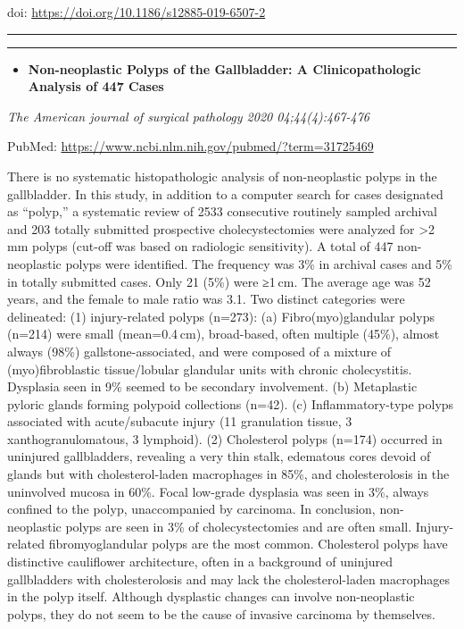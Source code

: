\documentclass[
]{article}
\providecommand{\tightlist}{%
  \setlength{\itemsep}{0pt}\setlength{\parskip}{0pt}}
\begin{document}
doi: \url{https://doi.org/10.1186/s12885-019-6507-2}

\begin{center}\rule{0.5\linewidth}{0.5pt}\end{center}

\begin{center}\rule{0.5\linewidth}{0.5pt}\end{center}

\begin{itemize}
\tightlist
\item
  \textbf{Non-neoplastic Polyps of the Gallbladder: A Clinicopathologic
  Analysis of 447 Cases}
\end{itemize}

\emph{The American journal of surgical pathology 2020 04;44(4):467-476}

PubMed: \url{https://www.ncbi.nlm.nih.gov/pubmed/?term=31725469}

There is no systematic histopathologic analysis of non-neoplastic polyps
in the gallbladder. In this study, in addition to a computer search for
cases designated as ``polyp,'' a systematic review of 2533 consecutive
routinely sampled archival and 203 totally submitted prospective
cholecystectomies were analyzed for \textgreater2 mm polyps (cut-off was
based on radiologic sensitivity). A total of 447 non-neoplastic polyps
were identified. The frequency was 3\% in archival cases and 5\% in
totally submitted cases. Only 21 (5\%) were ≥1 cm. The average age was
52 years, and the female to male ratio was 3.1. Two distinct categories
were delineated: (1) injury-related polyps (n=273): (a)
Fibro(myo)glandular polyps (n=214) were small (mean=0.4 cm),
broad-based, often multiple (45\%), almost always (98\%)
gallstone-associated, and were composed of a mixture of
(myo)fibroblastic tissue/lobular glandular units with chronic
cholecystitis. Dysplasia seen in 9\% seemed to be secondary involvement.
(b) Metaplastic pyloric glands forming polypoid collections (n=42). (c)
Inflammatory-type polyps associated with acute/subacute injury (11
granulation tissue, 3 xanthogranulomatous, 3 lymphoid). (2) Cholesterol
polyps (n=174) occurred in uninjured gallbladders, revealing a very thin
stalk, edematous cores devoid of glands but with cholesterol-laden
macrophages in 85\%, and cholesterolosis in the uninvolved mucosa in
60\%. Focal low-grade dysplasia was seen in 3\%, always confined to the
polyp, unaccompanied by carcinoma. In conclusion, non-neoplastic polyps
are seen in 3\% of cholecystectomies and are often small. Injury-related
fibromyoglandular polyps are the most common. Cholesterol polyps have
distinctive cauliflower architecture, often in a background of uninjured
gallbladders with cholesterolosis and may lack the cholesterol-laden
macrophages in the polyp itself. Although dysplastic changes can involve
non-neoplastic polyps, they do not seem to be the cause of invasive
carcinoma by themselves.
\end{document}
